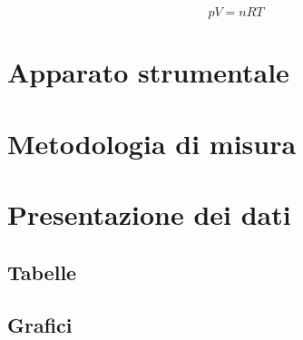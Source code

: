 \documentclass[10pt,a4paper]{article} %
\begin{document}
\maketitle %

\begin{center}
\fontsize{66pt}{10pt}\selectfont
\[
 pV=nRT
\]
\end{center}

\begin{abstract}
	\noindent
	
\end{abstract}

\newpage

\tableofcontents %


\section{Apparato strumentale}
	

\section{Metodologia di misura}
	

\newpage
\section{Presentazione dei dati}			
	\subsection{Tabelle}
	
	\clearpage
	\subsection{Grafici}
	
	
\end{document}
